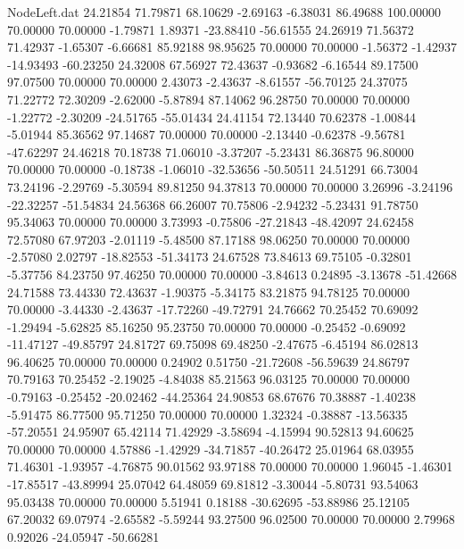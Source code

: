 \begin{filecontents}{NodeLeft.dat}
  24.21854   71.79871   68.10629    -2.69163   -6.38031   86.49688  100.00000   70.00000   70.00000   -1.79871    1.89371  -23.88410  -56.61555
  24.26919   71.56372   71.42937    -1.65307   -6.66681   85.92188   98.95625   70.00000   70.00000   -1.56372   -1.42937  -14.93493  -60.23250
  24.32008   67.56927   72.43637    -0.93682   -6.16544   89.17500   97.07500   70.00000   70.00000    2.43073   -2.43637   -8.61557  -56.70125
  24.37075   71.22772   72.30209    -2.62000   -5.87894   87.14062   96.28750   70.00000   70.00000   -1.22772   -2.30209  -24.51765  -55.01434
  24.41154   72.13440   70.62378    -1.00844   -5.01944   85.36562   97.14687   70.00000   70.00000   -2.13440   -0.62378   -9.56781  -47.62297
  24.46218   70.18738   71.06010    -3.37207   -5.23431   86.36875   96.80000   70.00000   70.00000   -0.18738   -1.06010  -32.53656  -50.50511
  24.51291   66.73004   73.24196    -2.29769   -5.30594   89.81250   94.37813   70.00000   70.00000    3.26996   -3.24196  -22.32257  -51.54834
  24.56368   66.26007   70.75806    -2.94232   -5.23431   91.78750   95.34063   70.00000   70.00000    3.73993   -0.75806  -27.21843  -48.42097
  24.62458   72.57080   67.97203    -2.01119   -5.48500   87.17188   98.06250   70.00000   70.00000   -2.57080    2.02797  -18.82553  -51.34173
  24.67528   73.84613   69.75105    -0.32801   -5.37756   84.23750   97.46250   70.00000   70.00000   -3.84613    0.24895   -3.13678  -51.42668
  24.71588   73.44330   72.43637    -1.90375   -5.34175   83.21875   94.78125   70.00000   70.00000   -3.44330   -2.43637  -17.72260  -49.72791
  24.76662   70.25452   70.69092    -1.29494   -5.62825   85.16250   95.23750   70.00000   70.00000   -0.25452   -0.69092  -11.47127  -49.85797
  24.81727   69.75098   69.48250    -2.47675   -6.45194   86.02813   96.40625   70.00000   70.00000    0.24902    0.51750  -21.72608  -56.59639
  24.86797   70.79163   70.25452    -2.19025   -4.84038   85.21563   96.03125   70.00000   70.00000   -0.79163   -0.25452  -20.02462  -44.25364
  24.90853   68.67676   70.38887    -1.40238   -5.91475   86.77500   95.71250   70.00000   70.00000    1.32324   -0.38887  -13.56335  -57.20551
  24.95907   65.42114   71.42929    -3.58694   -4.15994   90.52813   94.60625   70.00000   70.00000    4.57886   -1.42929  -34.71857  -40.26472
  25.01964   68.03955   71.46301    -1.93957   -4.76875   90.01562   93.97188   70.00000   70.00000    1.96045   -1.46301  -17.85517  -43.89994
  25.07042   64.48059   69.81812    -3.30044   -5.80731   93.54063   95.03438   70.00000   70.00000    5.51941    0.18188  -30.62695  -53.88986
  25.12105   67.20032   69.07974    -2.65582   -5.59244   93.27500   96.02500   70.00000   70.00000    2.79968    0.92026  -24.05947  -50.66281

\end{filecontents}
